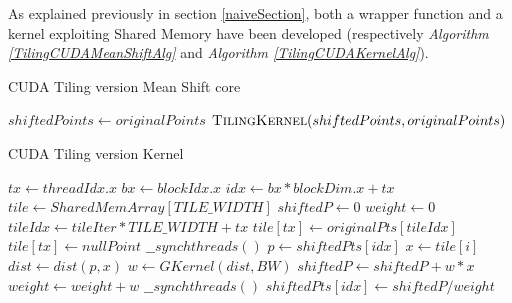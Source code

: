 \documentclass[10pt,twocolumn,letterpaper]{article}
\begin{document}
As explained previously in section \ref{naiveSection}, both a wrapper function and a kernel exploiting Shared Memory have been developed (respectively \emph{Algorithm \ref{TilingCUDAMeanShiftAlg}} and \emph{Algorithm \ref{TilingCUDAKernelAlg}}).

\begin{algorithm}
\caption{CUDA Tiling version Mean Shift core}
\label{TilingCUDAMeanShiftAlg}
\begin{algorithmic}
	\State$shiftedPoints \gets originalPoints$
    		\State $\Call{TilingKernel}{shiftedPoints, originalPoints}$
    \EndWhile
\EndFunction
\end{algorithmic}
\end{algorithm}


\begin{algorithm}
\caption{CUDA Tiling version Kernel }
\label{TilingCUDAKernelAlg}
\begin{algorithmic}
	\State $tx \gets threadIdx.x$
	\State $bx \gets blockIdx.x$
	\State $idx \gets bx * blockDim.x + tx$
	\State $tile \gets SharedMemArray[TILE\_WIDTH]$
	\State $shiftedP \gets 0$
	\State $weight \gets 0$
		\State$tileIdx \gets tileIter * TILE\_WIDTH + tx$
			\State$tile[tx] \gets originalPts[tileIdx]$
		\Else
			\State$tile[tx] \gets nullPoint$
		\EndIf
		\State$\_\_synchthreads()$
			\State $p \gets shiftedPts[idx]$
    				\State $x \gets tile[i]$
    					\State $dist \gets dist(p, x)$
    					\State $w \gets GKernel(dist, BW)$
    					\State $shiftedP\gets shiftedP + w*x$
    					\State $weight \gets weight + w$
    				\EndIf
    			\EndFor
    		\EndIf
    		\State$\_\_synchthreads()$
	\EndFor
    		\State $shiftedPts[idx] \gets shiftedP/weight$
    	\EndIf
    
\EndFunction
\end{algorithmic}
\end{algorithm}
\end{document}
